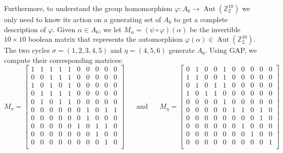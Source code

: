 \documentclass[10pt,leqno]{amsart}
\DeclareMathOperator{\Aut}{Aut}
\newcommand{\Z}{\mathbb{Z}}
\begin{document}
Furthermore, to understand the group homomorphism $\varphi:A_6 \to \Aut(\Z_2^{10})$ we only need to know its action on a generating set of $A_6$ to get a complete description of $\varphi$. Given $\alpha \in A_6$, we let $M_\alpha=(\psi\circ \varphi)(\alpha)$ be the invertible $10\times 10$ boolean matrix that represents the automorphism $\varphi(\alpha)\in\Aut(\Z_2^{10})$. The two cycles  $\sigma = (1,2,3,4,5)$ and $\eta = (4,5,6)$ generate $A_6$. Using GAP, we compute their corresponding matrices:
\[   
    M_\sigma = 
    \begin{bmatrix}
    	1 & 1 & 1 & 1 & 1 & 0 & 0 & 0 & 0 & 0 \\
            0 & 0 & 1 & 1 & 1 & 0 & 0 & 0 & 0 & 0 \\
            1 & 0 & 1 & 0 & 1 & 0 & 0 & 0 & 0 & 0 \\
            0 & 1 & 1 & 1 & 1 & 0 & 0 & 0 & 0 & 0 \\
            0 & 1 & 0 & 1 & 1 & 0 & 0 & 0 & 0 & 0 \\
            0 & 0 & 0 & 0 & 0 & 0 & 1 & 0 & 1 & 1 \\
            0 & 0 & 0 & 0 & 0 & 0 & 1 & 0 & 0 & 0 \\
            0 & 0 & 0 & 0 & 0 & 1 & 0 & 1 & 1 & 0 \\
            0 & 0 & 0 & 0 & 0 & 0 & 0 & 1 & 0 & 0 \\
            0 & 0 & 0 & 0 & 0 & 0 & 0 & 0 & 1 & 0 \\
    \end{bmatrix}
     \text{ ~~~ and ~~~ }
    M_\eta = 
    \begin{bmatrix}
    	0 & 1 & 0 & 0 & 1 & 0 & 0 & 0 & 0 & 0 \\
            1 & 1 & 0 & 0 & 1 & 0 & 0 & 0 & 0 & 0 \\
            0 & 1 & 0 & 1 & 1 & 0 & 0 & 0 & 0 & 0 \\
            1 & 0 & 1 & 1 & 0 & 0 & 0 & 0 & 0 & 0 \\
            0 & 0 & 0 & 0 & 1 & 0 & 0 & 0 & 0 & 0 \\
            0 & 0 & 0 & 0 & 0 & 1 & 1 & 0 & 1 & 0 \\
            0 & 0 & 0 & 0 & 0 & 0 & 0 & 0 & 1 & 0 \\
            0 & 0 & 0 & 0 & 0 & 0 & 1 & 0 & 0 & 0 \\
            0 & 0 & 0 & 0 & 0 & 0 & 0 & 1 & 0 & 0 \\
            0 & 0 & 0 & 0 & 0 & 0 & 0 & 0 & 0 & 1 \\
    \end{bmatrix}
    \label{matrices_gens}
\]
\end{document}
